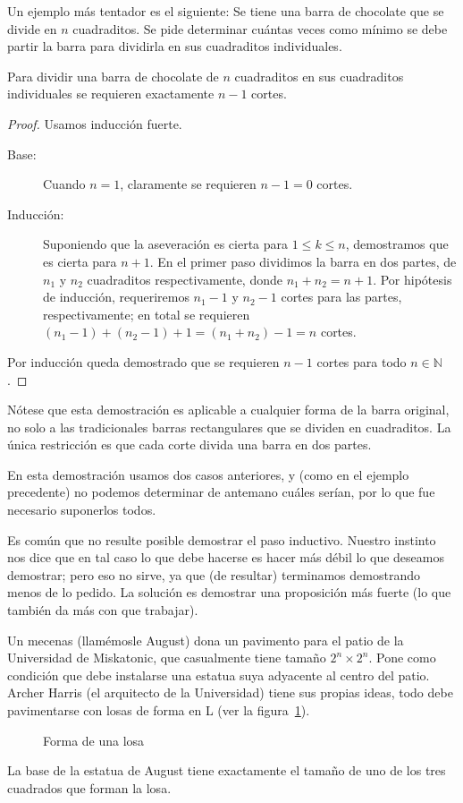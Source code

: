   Un ejemplo más tentador es el siguiente:
  Se tiene una barra de chocolate
  que se divide en \(n\) cuadraditos.
  Se pide determinar cuántas veces como mínimo
  se debe partir la barra
  para dividirla en sus cuadraditos individuales.
  \begin{proposition}
    \label{prop:cortar-chocolate}
    Para dividir una barra de chocolate de \(n\) cuadraditos
    en sus cuadraditos individuales
    se requieren exactamente \(n - 1\) cortes.
  \end{proposition}
  \begin{proof}
    Usamos inducción fuerte.
    \begin{description}
    \item[Base:]
      Cuando \(n = 1\),
      claramente se requieren \(n - 1 = 0\) cortes.
    \item[Inducción:]
      Suponiendo que la aseveración es cierta
      para \(1 \le k \le n\),
      demostramos que es cierta para \(n + 1\).
      En el primer paso dividimos la barra en dos partes,
      de \(n_1\) y \(n_2\) cuadraditos respectivamente,
      donde \(n_1 + n_2 = n + 1\).
      Por hipótesis de inducción,
      requeriremos \(n_1 - 1\) y \(n_2 - 1\) cortes para las partes,
      respectivamente;
      en total se requieren
	\((n_1 - 1) + (n_2 - 1) + 1 = (n_1 + n_2) - 1 = n\) cortes.
    \end{description}
    Por inducción queda demostrado que se requieren \(n - 1\) cortes
    para todo \(n \in \mathbb{N}\).
  \end{proof}
  Nótese que esta demostración
  es aplicable a cualquier forma de la barra original,
  no solo a las tradicionales barras rectangulares
  que se dividen en cuadraditos.
  La única restricción
  es que cada corte divida una barra en dos partes.

  En esta demostración usamos dos casos anteriores,
  y
  (como en el ejemplo precedente)
  no podemos determinar de antemano cuáles serían,
  por lo que fue necesario suponerlos todos.

  Es común que no resulte posible demostrar el paso inductivo.
  Nuestro instinto nos dice
  que en tal caso lo que debe hacerse es hacer más débil
  lo que deseamos demostrar;
  pero eso no sirve,
  ya que (de resultar) terminamos demostrando menos de lo pedido.
  La solución es demostrar una proposición más fuerte
  (lo que también da más con que trabajar).

  Un mecenas
  (llamémosle \foreignlanguage{english}{August})
  dona un pavimento para el patio de la Universidad de Miskatonic,%
  que casualmente tiene tamaño \mbox{\(2^n \times 2^n\)}.
  Pone como condición que debe instalarse una estatua suya
  adyacente al centro del patio.
  Archer Harris
  (el arquitecto de la Universidad)
  tiene sus propias ideas,
  todo debe pavimentarse con losas de forma en L
  (ver la figura~\ref{fig:tile}).
  \begin{figure}[htbp]
    \centering
    \caption{Forma de una losa}
    \label{fig:tile}
  \end{figure}
  La base de la estatua de \foreignlanguage{english}{August}
  tiene exactamente el tamaño
  de uno de los tres cuadrados que forman la losa.

